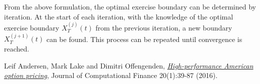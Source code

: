 \documentclass[12pt]{article}
\begin{document}
    From the above formulation, the optimal exercise boundary can be determined by iteration. At the start of
    each iteration, with the knowledge of the optimal exercise boundary $X_T^{(j)}(t)$ from the previous iteration,
    a new boundary $X_T^{(j+1)}(t)$ can be found. This process can be repeated until convergence is reached.





\begin{thebibliography}{99}
    Leif Andersen, Mark Lake and Dimitri Offengenden,
    \href{https://www.risk.net/journal-of-computational-finance/2464632/high-performance-american-option-pricing}
    {\it High-performance American option pricing},
    Journal of Computational Finance 20(1):39-87 (2016).
\end{thebibliography}
\end{document}
